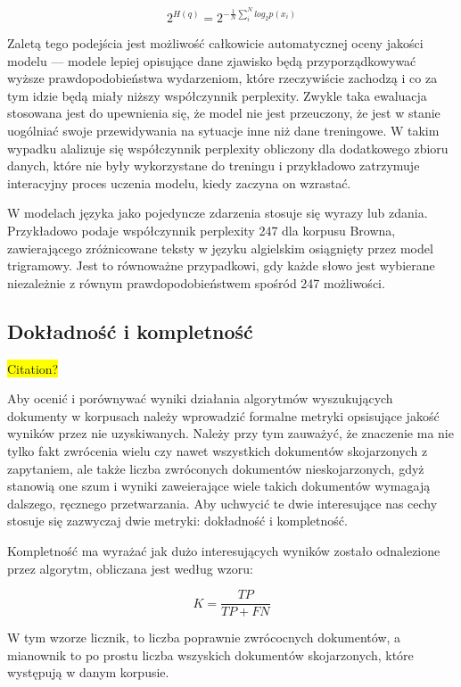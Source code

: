 \documentclass[11pt,a4paper]{article}
\newcommand{\todo}[1]{\colorbox{yellow}{#1}}
\begin{document}
\begin{equation}
  2^{H(q)} = 2^{-\frac{1}{N}\sum_i^N log_2 p(x_i)}
\end{equation}

Zaletą tego podejścia jest możliwość całkowicie automatycznej oceny jakości
modelu --- modele lepiej opisujące dane zjawisko będą przyporządkowywać wyższe
prawdopodobieństwa wydarzeniom, które rzeczywiście zachodzą i co za tym idzie
będą miały niższy współczynnik perplexity. Zwykle taka ewaluacja stosowana jest
do upewnienia się, że model nie jest przeuczony, że jest w stanie uogólniać
swoje przewidywania na sytuacje inne niż dane treningowe. W takim wypadku
alalizuje się współczynnik perplexity obliczony dla dodatkowego zbioru
danych, które nie były wykorzystane do treningu i przykładowo zatrzymuje
interacyjny proces uczenia modelu, kiedy zaczyna on wzrastać.

W modelach języka jako pojedyncze zdarzenia stosuje się wyrazy lub zdania.
Przykładowo \cite{perplexity-estimate} podaje współczynnik perplexity 247 dla
korpusu Browna, zawierającego zróżnicowane teksty w języku algielskim
osiągnięty przez model trigramowy. Jest to równoważne przypadkowi, gdy każde
słowo jest wybierane niezależnie z równym prawdopodobieństwem spośród 247
możliwości.

\subsection{Dokładność i kompletność}

\todo{Citation?}

Aby ocenić i porównywać wyniki działania algorytmów wyszukujących dokumenty w
korpusach należy wprowadzić formalne metryki opsisujące jakość wyników przez
nie uzyskiwanych. Należy przy tym zauważyć, że znaczenie ma nie tylko fakt
zwrócenia wielu czy nawet wszystkich dokumentów skojarzonych z zapytaniem, ale
także liczba zwróconych dokumentów nieskojarzonych, gdyż stanowią one szum i
wyniki zaweierające wiele takich dokumentów wymagają dalszego, ręcznego
przetwarzania. Aby uchwycić te dwie interesujące nas cechy stosuje się
zazwyczaj dwie metryki: dokładność i kompletność.

Kompletność ma wyrażać jak dużo interesujących wyników zostało odnalezione przez
algorytm, obliczana jest według wzoru:

\begin{equation}
  K = \frac{TP}{TP + FN}
\end{equation}

W tym wzorze licznik, to liczba poprawnie zwrócocnych dokumentów, a mianownik
to po prostu liczba wszyskich dokumentów skojarzonych, które występują w danym
korpusie.
\end{document}
